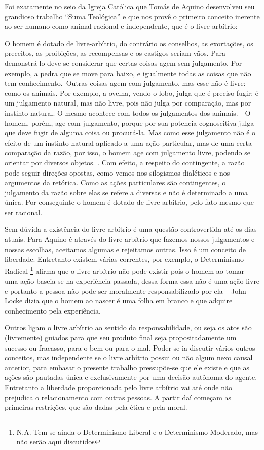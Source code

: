 \documentclass[
	12pt,				%
	openright,			%
	twoside,			%
	a4paper,			%
	chapter=TITLE,		%
	section=TITLE,		%
	subsection=TITLE,	%
	subsubsection=TITLE,%
	spanish,            %
	english,			%
	brazil				%
	]{abntex2}
\begin{document}
Foi exatamente no seio da Igreja Católica que Tomás de Aquino desenvolveu seu grandioso trabalho “Suma Teológica” e que nos provê
o primeiro conceito inerente ao ser humano como animal racional e independente, que é o livre arbítrio:
\begin{citacao}
O homem é dotado de livre-arbítrio, do contrário os conselhos, as exortações, os preceitos, as proibições, as recompensas e os castigos seriam vãos. Para demonstrá-lo deve-se considerar  que certas coisas agem sem julgamento. Por exemplo, a pedra que se move para baixo, e igualmente todas as coisas que não tem conhecimento.--Outras coisas agem com julgamento, mas esse não é livre: como os animais. Por exemplo, a ovelha, vendo o lobo, julga que é preciso fugir: é um julgamento natural, mas não livre, pois não julga por comparação, mas por instinto natural. O mesmo acontece com todos os julgamentos dos animais.---O homem, porém, age com julgamento, porque por sua potencia cognoscitiva julga que deve fugir de alguma coisa ou procurá-la. Mas como esse julgamento não é o efeito de um instinto natural aplicado a uma ação particular, mas de uma certa comparação da razão, por isso, o homem age com julgamento livre, podendo se orientar por diversos objetos. . Com efeito, a respeito do contingente, a razão pode seguir direções opostas, como vemos nos silogismos dialéticos e nos argumentos da retórica. Como as ações particulares são contingentes, o julgamento da razão sobre elas se refere  a diversas e não é determinado a uma única. Por conseguinte o homem é dotado de livre-arbítrio, pelo fato mesmo que ser racional.  \cite[p. ~487]{Aquino}
\end{citacao}
\par
Sem dúvida  a existência do livre arbítrio é uma questão controvertida até os dias atuais. Para Aquino é através do livre arbítrio que fazemos nossos julgamentos e nossas escolhas, aceitamos algumas e rejeitamos outras. Isso é um conceito de liberdade. Entretanto existem várias correntes, por exemplo, o Determinismo Radical  \footnote{N.A. Tem-se ainda o Determinismo Liberal e o Determinismo Moderado, mas não serão aqui discutidos} afirma que o livre arbítrio não pode existir pois o homem ao tomar uma ação baseia-se na experiência passada, dessa forma essa não é uma ação livre e portanto a pessoa não pode ser moralmente responsabilizado por ela -- John Locke dizia que o homem ao nascer é uma folha em branco e que adquire conhecimento pela experiência. 
\par
Outros ligam o livre arbítrio ao sentido da responsabilidade, ou seja os atos são (livremente) guiados para 
que seu produto final seja propositadamente um sucesso ou fracasso, para o bem ou para o mal. Poder-se-ia discutir vários outros conceitos, mas independente se o livre arbítrio possui ou não algum nexo causal anterior, para embasar o presente trabalho pressupõe-se que ele existe e que as ações são pautadas única e exclusivamente por uma decisão autônoma do agente. Entretanto a liberdade proporcionada  pelo livre arbítrio vai até onde não prejudica o relacionamento com outras pessoas. A partir daí começam as primeiras restrições, que são dadas pela ética e pela moral.
\end{document}
